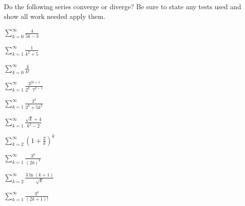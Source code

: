 \documentclass{exam}[12pt]
\begin{document}
\pagestyle{head}

\extraheadheight{-.3in}
\extrafootheight{-.3in} 


\vspace{.2in}
\large{

Do the following series converge or diverge? Be sure to state any
tests used and show all work needed apply them.

\begin{questions}

\question $\displaystyle
\sum_{k=0}^\infty \frac{4}{5k-3} $ 
\vspace{.3in}

\question $\displaystyle
\sum_{k=1}^\infty \frac{1}{k^2+5} $ 
\vspace{.3in}

\question $\displaystyle
\sum_{k=0}^\infty \frac{4}{k!} $ 
\vspace{.3in}

\question $\displaystyle
\sum_{k=1}^\infty \frac{3^{2k+1}}{2^k \; \;7^{k-1}} $
\vspace{.3in}

\question $\displaystyle
\sum_{k=1}^\infty \frac{3^k}{2^k + 5k^2} $ 
\vspace{.3in}

\question $\displaystyle
\sum_{k=1}^\infty \frac{\sqrt{ k}+4}{k^2 - 2} $ 
\vspace{.3in}

\question $\displaystyle
\sum_{k=2}^\infty \left(1 + \frac 2 k\right)^k $
\vspace{.3in}


\question $\displaystyle
\sum_{k=1}^\infty \frac{3^k}{(2k)^k} $ 
\vspace{.3in}

\question $\displaystyle \sum_{k=2}^\infty\frac{3\ln(k+1)}{\sqrt{k}}$
\vspace{.3in}

\question $\displaystyle
\sum_{k=1}^\infty \frac{3^k}{(2k +1)!} $ 

\end{questions}

}
\end{document}
